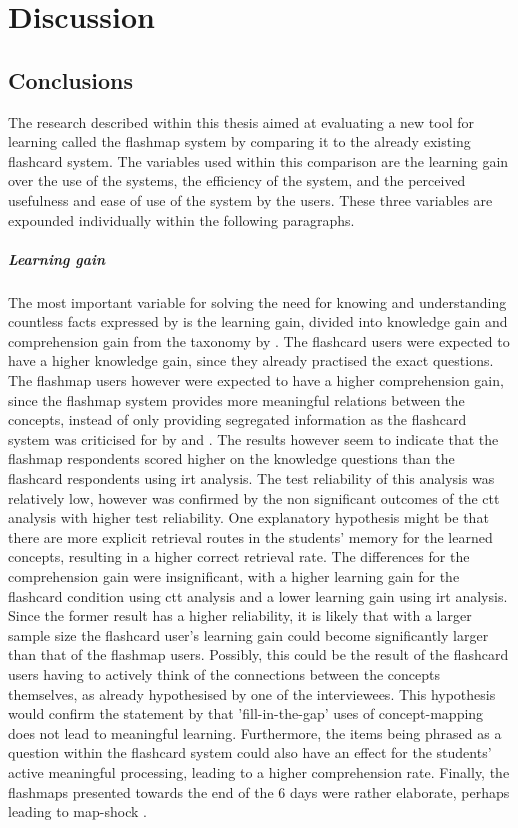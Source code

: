 \chapter{Discussion}
\label{ch:discussion}

\section{Conclusions}

The research described within this thesis aimed at evaluating a new tool for learning called the flashmap system by comparing it to the already existing flashcard system. The variables used within this comparison are the learning gain over the use of the systems, the efficiency of the system, and the perceived usefulness and ease of use of the system by the users. These three variables are expounded individually within the following paragraphs.

\paragraph{Learning gain} The most important variable for solving the need for knowing and understanding countless facts expressed by  is the learning gain, divided into knowledge gain and comprehension gain from the taxonomy by . The flashcard users were expected to have a higher knowledge gain, since they already practised the exact questions. The flashmap users however were expected to have a higher comprehension gain, since the flashmap system provides more meaningful relations between the concepts, instead of only providing segregated information as the flashcard system was criticised for by  and . The results however seem to indicate that the flashmap respondents scored higher on the knowledge questions than the flashcard respondents using irt analysis. The test reliability of this analysis was relatively low, however was confirmed by the non significant outcomes of the ctt analysis with higher test reliability. One explanatory hypothesis might be that there are more explicit retrieval routes in the students' memory for the learned concepts, resulting in a higher correct retrieval rate. The differences for the comprehension gain were insignificant, with a higher learning gain for the flashcard condition using ctt analysis and a lower learning gain using irt analysis. Since the former result has a higher reliability, it is likely that with a larger sample size the flashcard user's learning gain could become significantly larger than that of the flashmap users. Possibly, this could be the result of the flashcard users having to actively think of the connections between the concepts themselves, as already hypothesised by one of the interviewees. This hypothesis would confirm the statement by  that 'fill-in-the-gap' uses of concept-mapping does not lead to meaningful learning. Furthermore, the items being phrased as a question within the flashcard system could also have an effect for the students' active meaningful processing, leading to a higher comprehension rate. Finally, the flashmaps presented towards the end of the 6 days were rather elaborate, perhaps leading to map-shock \cite{moore}.

